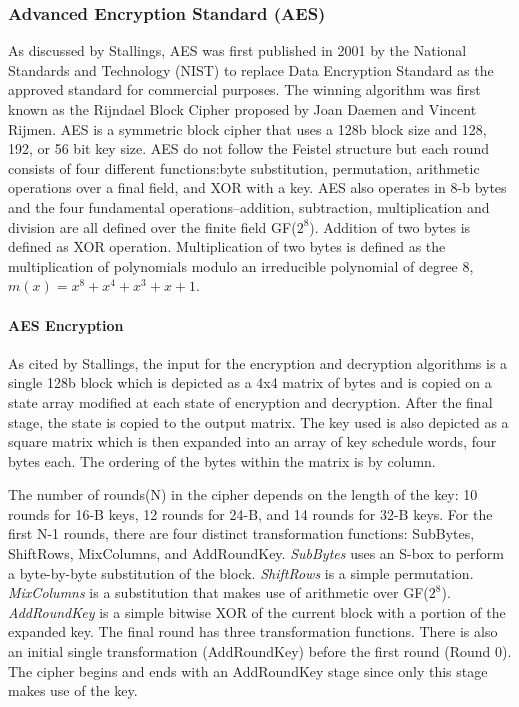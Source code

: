 \documentclass{article}
\begin{document}
\subsubsection{Advanced Encryption Standard (AES)}
As discussed by Stallings\cite{stallings2011}, AES was first published in 2001 by the National Standards and Technology (NIST) to replace Data Encryption Standard as the approved standard for commercial purposes. The winning algorithm was first known as the Rijndael Block Cipher proposed by Joan Daemen and Vincent Rijmen. AES is a symmetric block cipher that uses a 128b block size and 128, 192, or 56 bit key size. AES do not follow the Feistel structure but each round consists of four different functions:byte substitution, permutation, arithmetic operations over a final field, and XOR with a key. AES also operates in 8-b bytes and the four fundamental operations--addition, subtraction, multiplication and division are all defined over the finite field GF($2^{8}$). Addition of two bytes is defined as XOR operation. Multiplication of two bytes is defined as the multiplication of polynomials modulo an irreducible polynomial of degree 8, $m(x)=x^{8}+x^{4}+x^{3}+x+1$.

\paragraph{AES Encryption}
As cited by Stallings\cite{stallings2011}, the input for the encryption and decryption algorithms is a single 128b  block which is depicted as a 4x4 matrix of bytes and is copied on a state array modified at each state of encryption and decryption. After the final stage, the state is copied to the output matrix. The key used is also depicted as a square matrix which is then expanded into an array of key schedule words, four bytes each. The ordering of the bytes within the matrix is by column.

The number of rounds(N) in the cipher depends on the length of the key: 10 rounds for 16-B keys, 12 rounds for 24-B, and 14 rounds for 32-B keys. For the first N-1 rounds, there are four distinct transformation functions: SubBytes, ShiftRows, MixColumns, and AddRoundKey. \textit{SubBytes} uses an S-box to perform a byte-by-byte substitution of the block. \textit{ShiftRows} is a simple permutation. \textit{MixColumns} is a substitution that makes use of arithmetic over GF($2^{8}$). \textit{AddRoundKey} is a simple bitwise XOR of the current block with a portion of the expanded key. The final round has  three transformation functions. There is also an initial single transformation (AddRoundKey) before the first round (Round 0). The cipher begins and ends with an AddRoundKey stage since only this stage makes use of the key.
\end{document}
